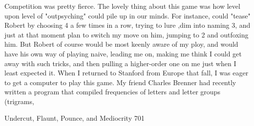         Competition was pretty fierce. The lovely thing about this game was how level
upon level of "outpsyching" could pile up in our minds. For instance, could "tease"
Robert by choosing 4 a few times in a row, trying to lure ,dim into naming 3, and just
at that moment plan to switch my move on him, jumping to 2 and outfoxing him. But
Robert of course would be most keenly aware of my ploy, and would have his own
way of playing naive, leading me on, making me think I could get away with such
tricks, and then pulling a higher-order one on me just when I least expected it.
         When I returned to Stanford from Europe that fall, I was eager to get a
computer to play this game. My friend Charles Brenner had recently written a
program that compiled frequencies of letters and letter groups (trigrams,




Undercut, Flaunt, Pounce, and Mediocrity                                            701

